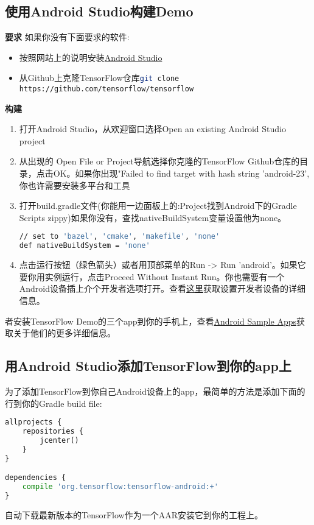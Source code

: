 \subsection{使用Android Studio构建Demo}
\textbf{要求}\newline
如果你没有下面要求的软件:
\begin{itemize}
\item 按照网站上的说明安装\href{https://developer.android.com/studio/index.html?hl=zh-cn}{Android Studio}
\item 从Github上克隆TensorFlow仓库\lstinline[language=Bash]{git clone https://github.com/tensorflow/tensorflow}
\end{itemize}
\textbf{构建}\newline
\begin{enumerate}
\item 打开Android Studio，从欢迎窗口选择Open an existing Android Studio project
\item 从出现的 Open File or Project导航选择你克隆的TensorFlow Github仓库的目录，点击OK。如果你出现"Failed to find target with hash string 'android-23',你也许需要安装多平台和工具
\item 打开build.gradle文件(你能用一边面板上的:Project找到Android下的Gradle Scripts zippy)如果你没有，查找nativeBuildSystem变量设置他为none。
\begin{lstlisting}[language=Bash]
// set to 'bazel', 'cmake', 'makefile', 'none'
def nativeBuildSystem = 'none'

\end{lstlisting}
\item 点击运行按钮（绿色箭头）或者用顶部菜单的Run -> Run 'android'。如果它要你用实例运行，点击Proceed Without Instant Run。你也需要有一个Android设备插上介个开发者选项打开。查看\href{https://developer.android.com/studio/run/device.html?hl=zh-cn}{这里}获取设置开发者设备的详细信息。
\end{enumerate}
者安装TensorFlow Demo的三个app到你的手机上，查看\href{https://www.tensorflow.org/mobile/android_build?hl=zh-cn#android_sample_apps}{Android Sample Apps}获取关于他们的更多详细信息。
\subsection{用Android Studio添加TensorFlow到你的app上}
为了添加TensorFlow到你自己Android设备上的app，最简单的方法是添加下面的行到你的Gradle build file:
\begin{lstlisting}[language=Python]
allprojects {
    repositories {
        jcenter()
    }
}

dependencies {
    compile 'org.tensorflow:tensorflow-android:+'
}

\end{lstlisting}
自动下载最新版本的TensorFlow作为一个AAR安装它到你的工程上。
